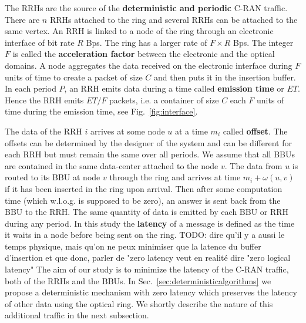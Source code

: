 \documentclass[10pt, conference, letterpaper]{IEEEtran}
\newcommand{\todo}[1]{{\color{red} TODO: {#1}}}
\begin{document}
   The RRHs are the source of the {\bf deterministic and periodic} C-RAN traffic.
   There are $n$ RRHs attached to the ring and several RRHs can be attached to the same vertex. An RRH is linked to a node of the ring through an electronic interface of bit rate $R$ Bps.
   The ring has a larger rate of $F\times R$ Bps. The integer $F$ is called the {\bf acceleration factor} between the electronic and the optical domains. A node aggregates the data received on the electronic interface during $F$ units of time to create a packet of size $C$ and then puts it in the insertion buffer.
  In each period $P$, an RRH emits data during a time called \textbf{emission time} or $ET$. Hence the RRH emits $ET / F$ packets, i.e. a container of size $C$ each $F$ units of time during the emission time, see Fig.~\ref{fig:interface}.
   
   The data of the RRH $i$ arrives at some node $u$ at a time $m_i$ called {\bf offset}. The offsets can be determined 
   by the designer of the system and can be different for each RRH but must remain the same over all periods. We assume that all BBUs are contained in the same data-center attached to the node $v$. The data from $u$ is routed to its BBU at node $v$ through the ring and arrives at time $m_i + \omega(u,v)$ if it has been inserted in the ring upon arrival. Then after some computation time (which w.l.o.g. is supposed to be zero), an answer is sent back from the BBU to the RRH. The same quantity of data is emitted by each BBU or RRH during any period.
   In this study the {\bf latency} of a message is defined as the time it waits in a node before being sent on the ring. \todo{dire qu'il y a aussi le temps physique, mais qu'on ne peux minimiser que la latence du buffer d'insertion et que donc, parler de "zero latency veut en realité dire "zero logical latency"}
   The aim of our study is to minimize the latency of the C-RAN traffic, both of the RRHs and the BBUs. 
   In Sec.~\ref{sec:deterministicalgorithms} we propose a deterministic mechanism with zero latency which preserves the latency of other data using the optical ring. We shortly describe the nature of this additional traffic in the next subsection.
   
\end{document}
